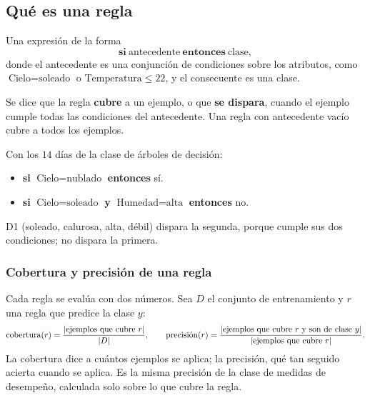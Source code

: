 \documentclass[11pt,letterpaper]{article}
\begin{document}
\subsection*{Qué es una regla}

\begin{definicion}
    Una expresión de la forma
    \[
        \textbf{si}\ \text{antecedente}\ \textbf{entonces}\ \text{clase} ,
    \]
    donde el antecedente es una conjunción de condiciones sobre los
    atributos, como $\text{Cielo} = \text{soleado}$ o
    $\text{Temperatura} \leq 22$, y el consecuente es una clase.
\end{definicion}

Se dice que la regla \textbf{cubre} a un ejemplo, o que \textbf{se
dispara}, cuando el ejemplo cumple todas las condiciones del
antecedente. Una regla con antecedente vacío cubre a todos los
ejemplos.

\begin{ejemplo}
    Con los $14$ días de la clase de árboles de decisión:
    \begin{itemize}[itemsep=0.2em]
        \item \textbf{si} $\text{Cielo} = \text{nublado}$
              \textbf{entonces} sí.
        \item \textbf{si} $\text{Cielo} = \text{soleado}$ \textbf{y}
              $\text{Humedad} = \text{alta}$ \textbf{entonces} no.
    \end{itemize}
    D1 (soleado, calurosa, alta, débil) dispara la segunda, porque
    cumple sus dos condiciones; no dispara la primera.
\end{ejemplo}

\subsubsection*{Cobertura y precisión de una regla}

Cada regla se evalúa con dos números. Sea $D$ el conjunto de
entrenamiento y $r$ una regla que predice la clase $y$:
\[
    \text{cobertura}(r) = \frac{\left\lvert \text{ejemplos que cubre } r \right\rvert}
                               {\left\lvert D \right\rvert} ,
    \qquad
    \text{precisión}(r) = \frac{\left\lvert \text{ejemplos que cubre } r
                                     \text{ y son de clase } y \right\rvert}
                               {\left\lvert \text{ejemplos que cubre } r \right\rvert} .
\]
La cobertura dice a cuántos ejemplos se aplica; la precisión, qué tan
seguido acierta cuando se aplica. Es la misma precisión de la clase de
medidas de desempeño, calculada solo sobre lo que cubre la regla.
\end{document}
